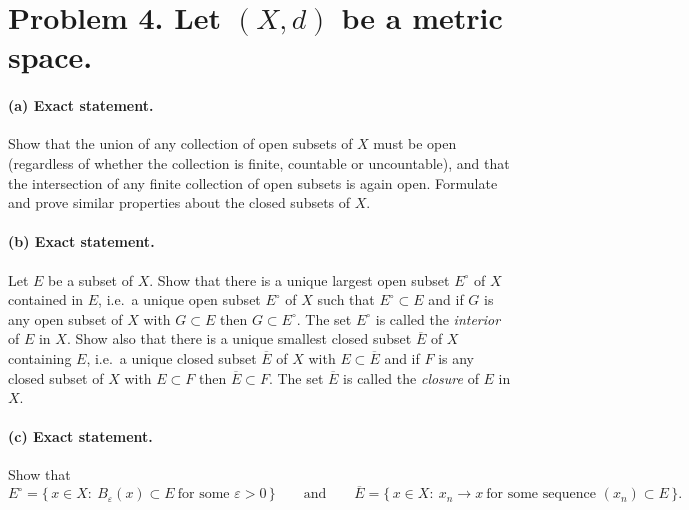 \documentclass[12pt,a4paper]{article}
\theoremstyle{plain}
\theoremstyle{definition}
\theoremstyle{remark}
\theoremstyle{remark}
\begin{document}
\section*{Problem 4. Let $(X,d)$ be a metric space.}

\paragraph{(a) Exact statement.}
Show that the union of any collection of open subsets of $X$ must be open (regardless of whether
the collection is finite, countable or uncountable), and that the intersection of any finite
collection of open subsets is again open. Formulate and prove similar properties about the
closed subsets of $X$.

\paragraph{(b) Exact statement.}
Let $E$ be a subset of $X$. Show that there is a unique largest open subset $E^\circ$ of $X$
contained in $E$, i.e.\ a unique open subset $E^\circ$ of $X$ such that $E^\circ\subset E$ and if
$G$ is any open subset of $X$ with $G\subset E$ then $G\subset E^\circ$. The set $E^\circ$ is
called the \emph{interior} of $E$ in $X$. Show also that there is a unique smallest closed subset
$\overline{E}$ of $X$ containing $E$, i.e.\ a unique closed subset $\overline{E}$ of $X$ with
$E\subset \overline{E}$ and if $F$ is any closed subset of $X$ with $E\subset F$ then
$\overline{E}\subset F$. The set $\overline{E}$ is called the \emph{closure} of $E$ in $X$.

\paragraph{(c) Exact statement.}
Show that
\[
E^\circ=\{\,x\in X:\ B_\varepsilon(x)\subset E\ \text{for some }\varepsilon>0\,\}
\qquad\text{and}\qquad
\overline{E}=\{\,x\in X:\ x_n\to x\ \text{for some sequence }(x_n)\subset E\,\}.
\]
\end{document}
